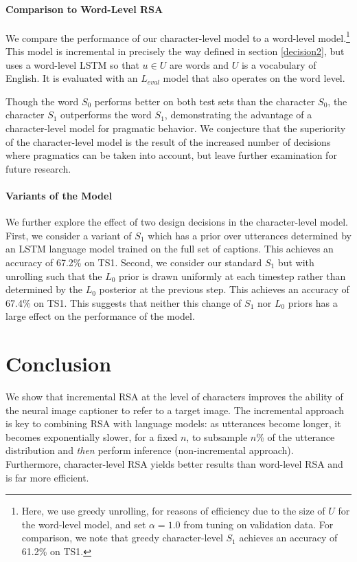 \documentclass[11pt,a4paper]{article}
\begin{document}
\paragraph{Comparison to Word-Level RSA} We compare the performance of our character-level model to a word-level model.\footnote{Here, we use greedy unrolling, for reasons of efficiency due to the size of $U$ for the word-level model, and set $\alpha=1.0$ from tuning on validation data. For comparison, we note that greedy character-level $S_1$ achieves an accuracy of 61.2\% on TS1.} This model is incremental in precisely the way defined in section \ref{decision2}, but uses a word-level LSTM so that $u\in U$ are words and $U$ is a vocabulary of English. It is evaluated with an $L_{\mathit{eval}}$ model that also operates on the word level. 

Though the word $S_0$ performs better on both test sets than the character $S_0$, the character $S_1$ outperforms the word $S_1$, demonstrating the advantage of a character-level model for pragmatic behavior. We conjecture that the superiority of the character-level model is the result of the increased number of decisions where pragmatics can be taken into account, but leave further examination for future research.

\paragraph{Variants of the Model} We further explore the effect of two design decisions in the character-level model. First, we consider a variant of $S_1$ which has a prior over utterances determined by an LSTM language model trained on the full set of captions. This achieves an accuracy of 67.2\% on TS1. Second, we consider our standard $S_1$ but with unrolling such that the $L_0$ prior is drawn uniformly at each timestep rather than determined by the $L_0$ posterior at the previous step. This achieves an accuracy of 67.4\% on TS1. This suggests that neither this change of $S_1$ nor $L_0$ priors has a large effect on the performance of the model.



\section{Conclusion}

We show that incremental RSA at the level of characters improves the ability of the neural image captioner to refer to a target image. The incremental approach is key to combining RSA with language models: as utterances become longer, it becomes exponentially slower, for a fixed $n$, to subsample $n$\% of the utterance distribution and \emph{then} perform inference (non-incremental approach). Furthermore, character-level RSA yields better results than word-level RSA and is far more efficient. 
\end{document}
